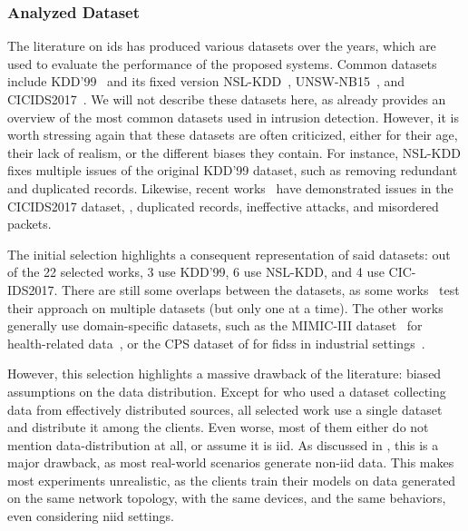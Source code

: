 \subsubsection{Analyzed Dataset\label{sec:sota.quali.dataset}}

The literature on \gls{ids} has produced various datasets over the years, which are used to evaluate the performance of the proposed systems.
Common datasets include KDD'99~\cite{kddcup99} and its fixed version NSL-KDD~\cite{tavallaee_detailedanalysisKDD_2009}, UNSW-NB15~\cite{moustafa_UNSWNB15comprehensivedata_2015}, and CICIDS2017~\cite{sharafaldin_GeneratingNewIntrusion_2018}.
We will not describe these datasets here, as  already provides an overview of the most common datasets used in intrusion detection.
However, it is worth stressing again that these datasets are often criticized, either for their age, their lack of realism, or the different biases they contain.
For instance, NSL-KDD fixes multiple issues of the original KDD'99 dataset, such as removing redundant and duplicated records.
Likewise, recent works~\cite{lanvin_ErrorsCICIDS2017dataset_2022,engelen_TroubleshootingIntrusionDetection_2021} have demonstrated issues in the CICIDS2017 dataset, \eg, duplicated records, ineffective attacks, and misordered packets.

The initial selection highlights a consequent representation of said datasets: out of the 22 selected works, 3 use KDD'99, 6 use NSL-KDD, and 4 use CIC-IDS2017.
There are still some overlaps between the datasets, as some works~\cite{zhao_MultiTaskNetworkAnomaly_2019,fan_IoTDefenderFederatedTransfer_2020,qin_LineSpeedScalableIntrusion_2020,chen_IntrusionDetectionWireless_2020} test their approach on multiple datasets (but only one at a time).
The other works generally use domain-specific datasets, such as the MIMIC-III dataset~\cite{johnson_MIMICIIIfreelyaccessible_2016} for health-related data~\cite{schneble_Attackdetectionusing_2019}, or the CPS dataset of \textcite{morris_IndustrialControlSystem_2014} for \glspl{fids} in industrial settings~\cite{li_DeepFedFederatedDeep_2020}.

However, this selection highlights a massive drawback of the literature: biased assumptions on the data distribution.
Except for  who used a dataset collecting data from effectively distributed sources, all selected work use a single dataset and distribute it among the clients.
Even worse, most of them either do not mention data-distribution at all, or assume it is \gls{iid}.
As discussed in , this is a major drawback, as most real-world scenarios generate non-\gls{iid} data.
This makes most experiments unrealistic, as the clients train their models on data generated on the same network topology, with the same devices, and the same behaviors, even considering \gls{niid} settings.


